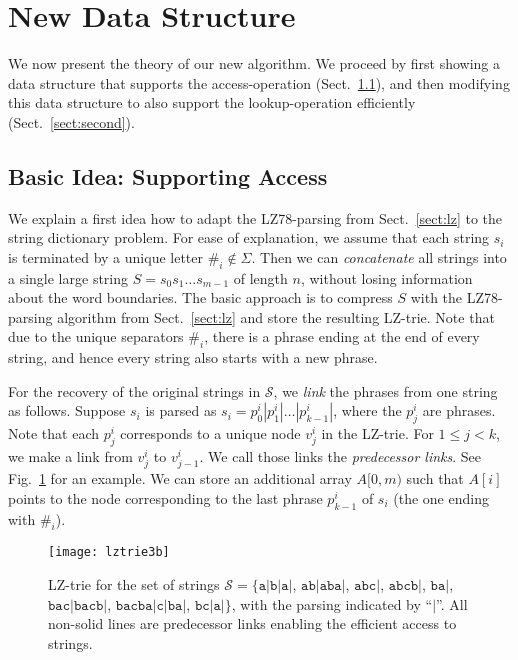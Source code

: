 \documentclass{llncs}
\newcommand{\strings}{\ensuremath{\mathcal{S}}}
\newcommand{\str}[1]{\ensuremath{\texttt{#1}}}
\begin{document}
\section{New Data Structure}
\label{sect:theoretical}

We now present the theory of our new algorithm. We proceed by first showing a data structure that supports the access-operation (Sect.\ \ref{sect:first}), and then modifying this data structure to also support the lookup-operation efficiently (Sect.\ \ref{sect:second}).

\subsection{Basic Idea: Supporting Access}
\label{sect:first}

We explain a first idea how to adapt the LZ78-parsing from Sect.~\ref{sect:lz} to the string dictionary problem. For ease of explanation, we assume that each string $s_i$ is terminated by a unique letter $\#_i\not\in\Sigma$. Then we can \emph{concatenate} all strings into a single large string $S=s_0s_1\dots s_{m-1}$ of length $n$, without losing information about the word boundaries. The basic approach is to compress $S$ with the LZ78-parsing algorithm from Sect.~\ref{sect:lz} and store the resulting LZ-trie. Note that due to the unique separators $\#_i$, there is a phrase ending at the end of every string, and hence every string also starts with a new phrase.

For the recovery of the original strings in \strings, we \emph{link} the phrases from one string as follows. Suppose $s_i$ is parsed as $s_i=p^i_0|p^i_1|\dots |p^i_{k-1}|$, where the $p^i_j$ are phrases. Note that each $p^i_j$ corresponds to a unique node $v^i_j$ in the LZ-trie. For $1\le j < k$, we make a link from $v^i_j$ to $v^i_{j-1}$. We call those links the \emph{predecessor links}. See Fig.\ \ref{fig:example1} for an example. We can store an additional array $A[0,m)$ such that $A[i]$ points to the node corresponding to the last phrase $p^i_{k-1}$ of $s_i$ (the one ending with $\#_i$).

\begin{figure}[t]
  \centering
  \texttt{[image: lztrie3b]}
  \caption{LZ-trie for the set of strings $\strings=\{\str{a}|\str{b}|\str{a}|$, $\str{ab}|\str{aba}|$, $\str{abc}|$, $\str{abcb}|$, $\str{ba}|$, $\str{bac}|\str{bacb}|$, $\str{bacba}|\str{c}|\str{ba}|$, $\str{bc}|\str{a}|\}$, with the parsing indicated by ``$|$''. All non-solid lines are predecessor links enabling the efficient access to strings.}
  \label{fig:example1}
\end{figure}
\end{document}
